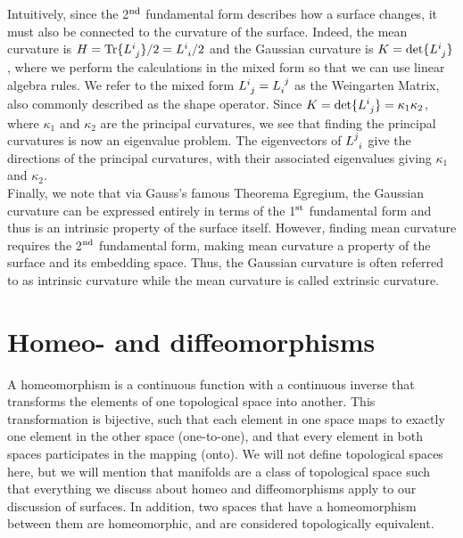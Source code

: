 \begin{appendices}
Intuitively, since the 2$^{\rm nd}$ fundamental form describes how a surface changes, it must also be connected to the curvature of the surface.
Indeed, the mean curvature is $H = \textrm{Tr}\{ \tensor{L}{^i_j} \}/2 = \tensor{L}{^i_i}/2$ and the Gaussian curvature is $K = \det \{ \tensor{L}{^i_j} \}$, where we perform the calculations in the mixed form so that we can use linear algebra rules.
We refer to the mixed form  $\tensor{L}{^i_j} = \tensor{L}{_i^j}$ as the Weingarten Matrix, also commonly described as the shape operator.
Since $K = \det \{ \tensor{L}{^i_j} \} = \kappa_1 \kappa_2$, where $\kappa_1$ and $\kappa_2$ are the principal curvatures, we see that finding the principal curvatures is now an eigenvalue problem.
The eigenvectors of $\tensor{L}{^j_i}$ give the directions of the principal curvatures, with their associated eigenvalues giving $\kappa_1$ and $\kappa_2$. \\

Finally, we note that via Gauss's famous Theorema Egregium, the Gaussian curvature can be expressed entirely in terms of the 1$^{\rm st}$ fundamental form and thus is an intrinsic property of the surface itself.
However, finding mean curvature requires the 2$^{\rm nd}$ fundamental form, making mean curvature a property of the surface and its embedding space.
Thus, the Gaussian curvature is often referred to as intrinsic curvature while the mean curvature is called extrinsic curvature.



\section{Homeo- and diffeomorphisms}
A homeomorphism is a continuous function with a continuous inverse that transforms the elements of one topological space into another. This transformation is bijective, such that each element in one space maps to exactly one element in the other space (one-to-one), and that every element in both spaces participates in the mapping (onto).
We will not define topological spaces here, but we will mention that manifolds are a class of topological space such that everything we discuss about homeo and diffeomorphisms apply to our discussion of surfaces.
In addition, two spaces that have a homeomorphism between them are homeomorphic, and are considered topologically equivalent. \\


\end{appendices}
